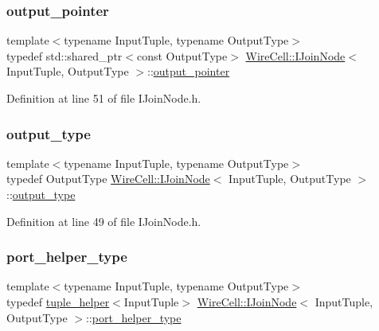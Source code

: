 \subsubsection{\texorpdfstring{output\+\_\+pointer}{output\_pointer}}
{\footnotesize\ttfamily template$<$typename Input\+Tuple, typename Output\+Type$>$ \\
typedef std\+::shared\+\_\+ptr$<$const Output\+Type$>$ \hyperlink{class_wire_cell_1_1_i_join_node}{Wire\+Cell\+::\+I\+Join\+Node}$<$ Input\+Tuple, Output\+Type $>$\+::\hyperlink{class_wire_cell_1_1_i_join_node_a7af33cc87415e15f0e7db2b083f3def7}{output\+\_\+pointer}}



Definition at line 51 of file I\+Join\+Node.\+h.

\mbox{\label{class_wire_cell_1_1_i_join_node_a792ae482c431febcce7de37f0ab10d82}} 
\subsubsection{\texorpdfstring{output\+\_\+type}{output\_type}}
{\footnotesize\ttfamily template$<$typename Input\+Tuple, typename Output\+Type$>$ \\
typedef Output\+Type \hyperlink{class_wire_cell_1_1_i_join_node}{Wire\+Cell\+::\+I\+Join\+Node}$<$ Input\+Tuple, Output\+Type $>$\+::\hyperlink{class_wire_cell_1_1_i_join_node_a792ae482c431febcce7de37f0ab10d82}{output\+\_\+type}}



Definition at line 49 of file I\+Join\+Node.\+h.

\mbox{\label{class_wire_cell_1_1_i_join_node_a7ca2ba39650f70ca5afe7d60ffcb662d}} 
\subsubsection{\texorpdfstring{port\+\_\+helper\+\_\+type}{port\_helper\_type}}
{\footnotesize\ttfamily template$<$typename Input\+Tuple, typename Output\+Type$>$ \\
typedef \hyperlink{struct_wire_cell_1_1tuple__helper}{tuple\+\_\+helper}$<$Input\+Tuple$>$ \hyperlink{class_wire_cell_1_1_i_join_node}{Wire\+Cell\+::\+I\+Join\+Node}$<$ Input\+Tuple, Output\+Type $>$\+::\hyperlink{class_wire_cell_1_1_i_join_node_a7ca2ba39650f70ca5afe7d60ffcb662d}{port\+\_\+helper\+\_\+type}}



